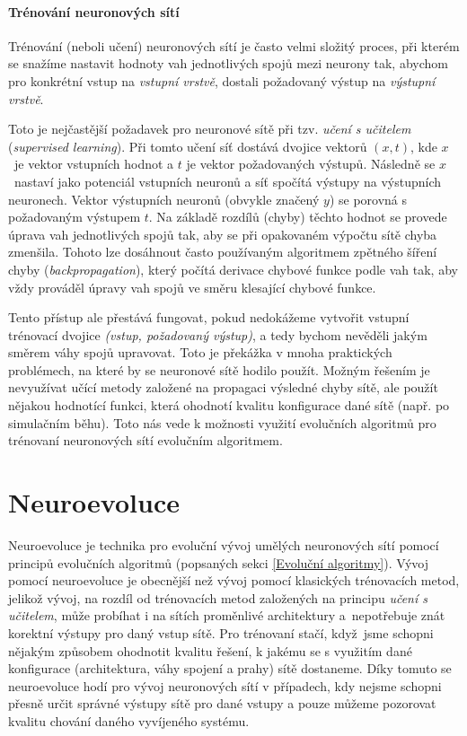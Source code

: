 \paragraph{Trénování neuronových sítí}
Trénování (neboli učení) neuronových sítí je často velmi složitý proces, při
kterém se snažíme nastavit hodnoty vah jednotlivých spojů mezi neurony tak,
abychom pro konkrétní vstup na \emph{vstupní vrstvě}, dostali požadovaný výstup
na \emph{výstupní vrstvě}. 

Toto je nejčastější požadavek pro neuronové sítě při tzv. \emph{učení s
učitelem} (\emph{supervised learning}). Při tomto učení síť dostává dvojice
vektorů $(x, t)$, kde $x$~je vektor vstupních hodnot a $t$ je vektor
požadovaných výstupů. Následně se $x$~nastaví jako potenciál vstupních neuronů
a síť spočítá výstupy na výstupních neuronech. Vektor výstupních neuronů
(obvykle značený $y$) se porovná s požadovaným výstupem $t$. Na základě rozdílů
(chyby) těchto hodnot se provede úprava vah jednotlivých spojů tak, aby se při
opakovaném výpočtu sítě chyba zmenšila. Tohoto lze dosáhnout často používaným
algoritmem zpětného šíření chyby (\emph{backpropagation}), který počítá
derivace chybové funkce podle vah tak, aby vždy prováděl úpravy vah spojů ve
směru klesající chybové funkce.

Tento přístup ale přestává fungovat, pokud nedokážeme vytvořit vstupní
trénovací dvojice \emph{(vstup, požadovaný výstup)}, a tedy bychom nevěděli jakým
směrem váhy spojů upravovat. Toto je překážka v mnoha praktických problémech,
na které by se neuronové sítě hodilo použít. Možným řešením je nevyužívat učící
metody založené na propagaci výsledné chyby sítě, ale použít nějakou hodnotící
funkci, která ohodnotí kvalitu konfigurace dané sítě (např. po simulačním
běhu). Toto nás vede k možnosti využití evolučních algoritmů pro trénovaní
neuronových sítí evolučním algoritmem.

\section{Neuroevoluce} \label{NN - evolve}
Neuroevoluce \citet{Lehman:2013} je technika pro evoluční vývoj umělých
neuronových sítí pomocí principů evolučních algoritmů (popsaných sekci
\ref{Evoluční algoritmy}). Vývoj pomocí neuroevoluce je obecnější než vývoj
pomocí klasických trénovacích metod, jelikož vývoj, na rozdíl od trénovacích
metod založených na principu \emph{učení s učitelem}, může probíhat i na sítích
proměnlivé architektury a~nepotřebuje znát korektní výstupy pro daný vstup
sítě. Pro trénovaní stačí, když~jsme schopni nějakým způsobem ohodnotit kvalitu
řešení, k jakému se s využitím dané konfigurace (architektura, váhy spojení a
prahy) sítě dostaneme. Díky tomuto se neuroevoluce hodí pro vývoj neuronových
sítí v případech, kdy nejsme schopni přesně určit správné výstupy sítě pro dané
vstupy a pouze můžeme pozorovat kvalitu chování daného vyvíjeného systému.

